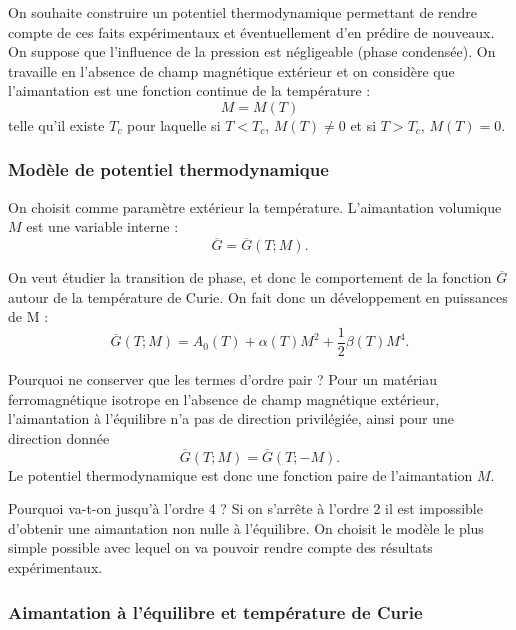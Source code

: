 \documentclass[11pt,a4paper]{report}
\begin{document}
On souhaite construire un potentiel thermodynamique permettant de rendre compte de ces faits expérimentaux et éventuellement d'en prédire de nouveaux. On suppose que l'influence de la pression est négligeable (phase condensée). On travaille en l'absence de champ magnétique extérieur et on considère que l'aimantation est une fonction continue de la température :
\begin{equation}
	M = M(T)
\end{equation}
telle qu'il existe $T_c$ pour laquelle si $T < T_c$, $M(T) \neq 0$ et si $T > T_c$, $M(T) = 0$.

\subsubsection*{Modèle de potentiel thermodynamique}

On choisit comme paramètre extérieur la température. L'aimantation volumique $M$ est une variable interne :
\begin{equation}
	\overline{G} = \overline{G}(T;M).
\end{equation}

On veut étudier la transition de phase, et donc le comportement de la fonction $\overline{G}$ autour de la température de Curie. On fait donc un développement en puissances de M :
\begin{equation}
	\overline{G}(T;M) = A_0(T) + \alpha(T) M^2 + \frac{1}{2}\beta(T)M^4.
\end{equation}

Pourquoi ne conserver que les termes d'ordre pair ? Pour un matériau ferromagnétique isotrope en l'absence de champ magnétique extérieur, l'aimantation à l'équilibre n'a pas de direction privilégiée, ainsi pour une direction donnée
\begin{equation}
	\overline{G}(T;M) = \overline{G}(T;-M).
\end{equation}
Le potentiel thermodynamique est donc une fonction paire de l'aimantation $M$.

Pourquoi va-t-on jusqu'à l'ordre 4 ? Si on s'arrête à l'ordre 2 il est impossible d'obtenir une aimantation non nulle à l'équilibre. On choisit le modèle le plus simple possible avec lequel on va pouvoir rendre compte des résultats expérimentaux.

\subsubsection*{Aimantation à l'équilibre et température de Curie}
\end{document}
